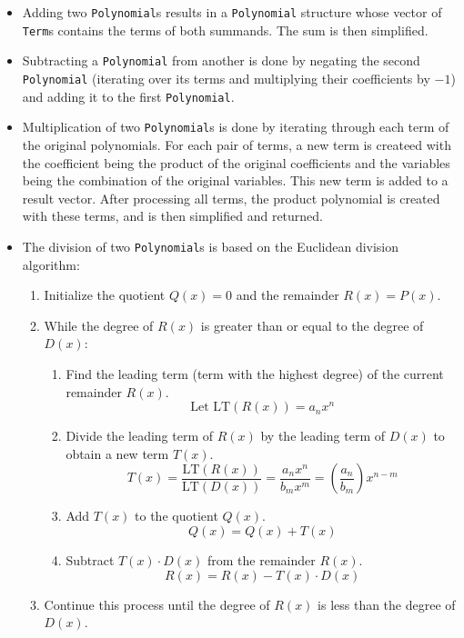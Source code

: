 \begin{itemize}
    \item Adding two \verb|Polynomial|s results in a \verb|Polynomial| structure whose vector of \verb|Term|s contains the terms of both summands. The sum is then simplified.
    \item Subtracting a \verb|Polynomial| from another is done by negating the second \verb|Polynomial| (iterating over its terms and multiplying their coefficients by $-1$) and adding it to the first \verb|Polynomial|.
    \item Multiplication of two \verb|Polynomial|s is done by iterating through each term of the original polynomials. For each pair of terms, a new term is createed with the coefficient being the product of the original coefficients and the variables being the combination of the original variables. This new term is added to a result vector. After processing all terms, the product polynomial is created with these terms, and is then simplified and returned.
    \item The division of two \verb|Polynomial|s is based on the Euclidean division algorithm:
    \begin{enumerate}
        \item Initialize the quotient \( Q(x) = 0 \) and the remainder \( R(x) = P(x) \).
        \item While the degree of \( R(x) \) is greater than or equal to the degree of \( D(x) \):
        \begin{enumerate}
            \item Find the leading term (term with the highest degree) of the current remainder \( R(x) \).
            \[
            \text{Let } \text{LT}(R(x)) = a_n x^n
            \]
            \item Divide the leading term of \( R(x) \) by the leading term of \( D(x) \) to obtain a new term \( T(x) \).
            \[
            T(x) = \frac{\text{LT}(R(x))}{\text{LT}(D(x))} = \frac{a_n x^n}{b_m x^m} = \left( \frac{a_n}{b_m} \right) x^{n-m}
            \]
            \item Add \( T(x) \) to the quotient \( Q(x) \).
            \[
            Q(x) = Q(x) + T(x)
            \]
            \item Subtract \( T(x) \cdot D(x) \) from the remainder \( R(x) \).
            \[
            R(x) = R(x) - T(x) \cdot D(x)
            \]
        \end{enumerate}
        \item Continue this process until the degree of \( R(x) \) is less than the degree of \( D(x) \).
    \end{enumerate}
\end{itemize}

